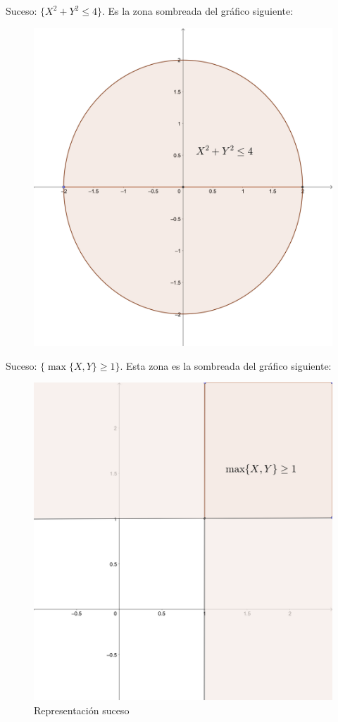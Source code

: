 \documentclass[]{book}
\begin{document}
Suceso: \(\{X^2+Y^2\leq 4\}\). Es la zona sombreada del gráfico siguiente:

\begin{figure}

{\centering \includegraphics{Images/Bidim2} 

}

\end{figure}

Suceso: \(\{\max\{X,Y\}\geq 1\}\). Esta zona es la sombreada del gráfico siguiente:

\begin{figure}
\centering
\includegraphics{Images/Bidim3.png}
\caption{\label{fig:bid3}Representación suceso}
\end{figure}
\end{document}
